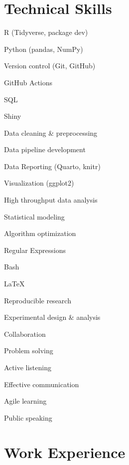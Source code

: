 \documentclass{resume}
\begin{document}
    \section{Technical Skills}
            \begin{skills}
                \item R (Tidyverse, package dev)
                \item Python (pandas, NumPy)
                \item Version control (Git, GitHub)
                \item GitHub Actions
                \item SQL
                \item Shiny
                \item Data cleaning \& preprocessing
                \item Data pipeline development
                \item Data Reporting (Quarto, knitr)
                \item Visualization (ggplot2)
                \item High throughput data analysis
                \item Statistical modeling
                \item Algorithm optimization
                \item Regular Expressions
                \item Bash
                \item \LaTeX
                \item Reproducible research
                \item Experimental design \& analysis
            \end{skills}

            \begin{skills}
                \item Collaboration
                \item Problem solving
                \item Active listening
                \item Effective communication
                \item Agile learning
                \item Public speaking
            \end{skills}


    \section{Work Experience}
\end{document}
